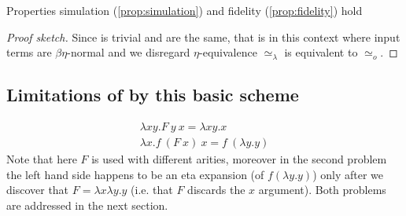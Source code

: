 \documentclass[sigconf,natbib=false,review]{acmart}
\newcommand{\UnifRel}{\ensuremath{\simeq}}
\newcommand{\Uo}{\ensuremath{\UnifRel_o}\xspace}
\newcommand{\Ue}{\ensuremath{\UnifRel_\lambda}\xspace}
\begin{document}
\begin{lemma} Properties simulation (\ref{prop:simulation}) and
fidelity (\ref{prop:fidelity}) hold
\end{lemma}
\begin{proof}[Proof sketch]
Since  is trivial \fstep and \hstep are the same, that is
in this
context where input terms are $\beta\eta$-normal and we disregard $\eta$-equivalence
\Ue is equivalent to \Uo.
\end{proof}

\subsection{Limitations of by this basic scheme}

\begin{gather}
\lambda x y.F~y~x = \lambda x y.x\\
\lambda x. f~(F~x)~x = f~(\lambda y.y)
\end{gather}
Note that here $F$ is used with different arities, moreover
in the second problem the left hand side happens to be an
eta expansion (of $f (\lambda y.y)$) only after we discover that
$F = \lambda x\lambda y.y$ (i.e. that $F$ discards the $x$ argument).
Both problems are addressed in the next section.
  




\end{document}
